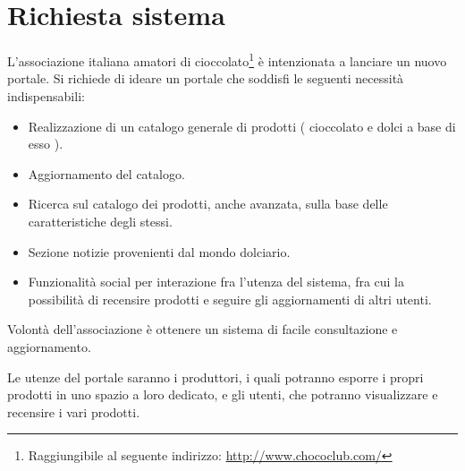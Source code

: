 \chapter{Richiesta sistema}

L’associazione italiana amatori di cioccolato\footnote{Raggiungibile al seguente indirizzo: \url{http://www.chococlub.com/}} è intenzionata a lanciare un nuovo portale.
Si richiede di ideare un portale che soddisfi le seguenti necessità indispensabili:
\begin{itemize}
    \item Realizzazione di un catalogo generale di prodotti ( cioccolato e dolci a base di esso ).
    \item Aggiornamento del catalogo.
    \item Ricerca sul catalogo dei prodotti, anche avanzata, sulla base delle caratteristiche degli stessi.
    \item Sezione notizie provenienti dal mondo dolciario.
    \item Funzionalità social per interazione fra l'utenza del sistema, fra cui la possibilità di recensire prodotti e seguire gli aggiornamenti di altri utenti.
\end{itemize}
Volontà dell'associazione è ottenere un sistema di facile consultazione e aggiornamento.

Le utenze del portale saranno i produttori, i quali potranno esporre i propri prodotti in uno spazio a loro dedicato, e gli utenti, che potranno visualizzare e recensire i vari prodotti.
